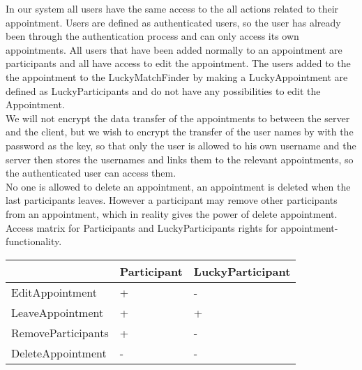 In our system all users have the same access to the all actions related to their appointment. Users are defined as authenticated users, so the user has already been through the authentication process and can only access its own appointments. All users that have been added normally to an appointment are participants and all have access to edit the appointment. The users added to the the appointment to the LuckyMatchFinder by making a LuckyAppointment are defined as LuckyParticipants and do not have any possibilities to edit the Appointment.\\

We will not encrypt the data transfer of the appointments to between the server and the client, but we wish to encrypt the transfer of the user names by with the password as the key, so that only the user is allowed to his own username and the server then stores the usernames and links them to the relevant appointments, so the authenticated user can access them. \\

No one is allowed to delete an appointment, an appointment is deleted when the last participants leaves. 
However a participant may remove other participants from an appointment, which in reality gives the power of delete appointment.
Access matrix for Participants and LuckyParticipants rights for appointment-functionality.\\
{\tabulinesep=1.2mm
\begin{tabu}{ | p{3cm} | p{6cm} | p{6cm} |}
    \hline
     	 			        & 		Participant         &		LuckyParticipant \\ \hline
    EditAppointment         &       +					&		-          \\\hline
    LeaveAppointment        &       +					&		+      \\ \hline
    RemoveParticipants		&		+					&		- 		\\\hline
    DeleteAppointment       &       -					&		-        \\  \hline
\end{tabu}
}